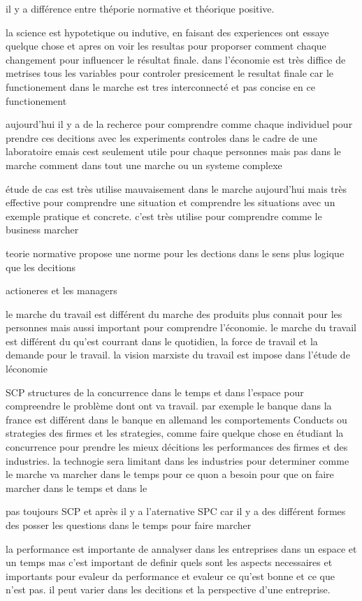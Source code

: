 \documentclass{article}
\begin{document}
il y a différence entre théporie normative et théorique positive.

la science est hypotetique ou indutive, en faisant des experiences ont essaye quelque chose et apres on voir les resultas pour proporser comment chaque changement pour influencer le résultat finale. dans l'économie est très diffice de metrises tous les variables pour controler presicement le resultat finale car le functionement dans le marche est tres interconnecté et pas concise en ce functionement

aujourd'hui il y a de la recherce pour comprendre comme chaque individuel pour prendre ces decitions avec les experiments controles dans le cadre de une laboratoire emais cest seulement utile pour chaque personnes mais pas dans le marche comment dans tout une marche ou un systeme complexe

étude de cas est très utilise mauvaisement dans le marche aujourd'hui mais très effective pour comprendre une situation et comprendre les situations avec un exemple pratique et concrete. c'est très utilise pour comprendre comme le business marcher

teorie normative propose une norme pour les dections dans le sens plus logique que les decitions

actioneres et les managers


le marche du travail est différent du marche des produits plus connait pour les personnes mais aussi important pour comprendre l'économie.
le marche du travail est différent du qu'est courrant dans le quotidien, la force de travail et la demande pour le travail. la vision marxiste du travail est impose dans l'étude de léconomie


SCP  
structures de la concurrence
dans le temps et dans l'espace pour compreendre le problème dont ont va travail. par exemple le banque dans la france est différent dans le banque en allemand
les comportements Conducts ou strategies des firmes et 
les strategies, comme faire quelque chose en étudiant la concurrence pour prendre les mieux décitions
les performances des firmes et des industries. 
la technogie  sera limitant dans les industries pour determiner comme le marche va marcher dans le temps pour ce quon a besoin pour que on faire marcher dans le temps et dans le

pas toujours SCP et après il y a l'aternative SPC car il y a des différent formes des posser les questions dans le temps pour faire marcher 

la performance est importante de annalyser dans les entreprises dans un espace et un temps mas c'est important de definir quels sont les aspects necessaires et importants pour evaleur da performance et evaleur ce qu'est bonne et ce que n'est pas. il peut varier dans les decitions et la perspective d'une entreprise.
\end{document}
